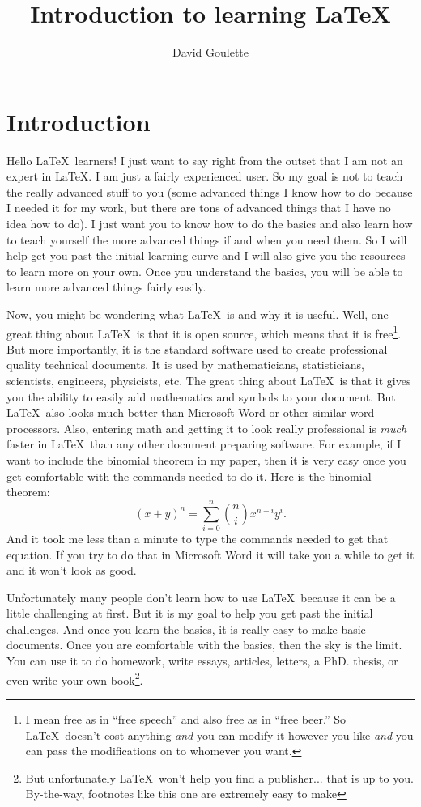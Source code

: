 \documentclass[11pt]{article}
\begin{document}
\author{David Goulette}
\title{Introduction to learning \LaTeX}
\maketitle
\section{Introduction}
Hello \LaTeX\ learners!  I just want to say right from the outset that I am not an expert in \LaTeX.  I am just a fairly experienced user.  So my goal is not to teach the really advanced stuff to you (some advanced things I know how to do because I needed it for my work, but there are tons of advanced things that I have no idea how to do).  I just want you to know how to do the basics and also learn how to teach yourself the more advanced things if and when you need them.  So I will help get you past the initial learning curve and I will also give you the resources to learn more on your own.  Once you understand the basics, you will be able to learn more advanced things fairly easily.

Now, you might be wondering what \LaTeX\ is and why it is useful. Well, one great thing about \LaTeX\ is that it is open source, which means that it is free\footnote{I mean free as in ``free speech'' and also free as in ``free beer.''  So \LaTeX\ doesn't cost anything \emph{and} you can modify it however you like \emph{and} you can pass the modifications on to whomever you want.}.  But more importantly, it is the standard software used to create professional quality technical documents.   It is used by mathematicians, statisticians, scientists, engineers, physicists, etc. The great thing about \LaTeX\ is that it gives you the ability to easily add mathematics and symbols to your document. But \LaTeX\ also looks much better than Microsoft Word or other similar word processors. Also, entering math and getting it to look really professional is \emph{much} faster in \LaTeX\ than any other document preparing software.  For example, if I want to include the binomial theorem in my paper, then it is very easy once you get comfortable with the commands needed to do it. Here is the binomial theorem:
\[
(x+y)^n=\sum_{i=0}^{n} \binom{n}{i} x^{n-i}y^i.
\]
And it took me less than a minute to type the commands needed to get that equation. If you try to do that in Microsoft Word it will take you a while to get it and it won't look as good.

Unfortunately many people don't learn how to use \LaTeX\ because it can be a little challenging at first.  But it is my goal to help you get past the initial challenges. And once you learn the basics, it is really easy to make basic documents. Once you are comfortable with the basics, then the sky is the limit.  You can use it to do homework, write essays, articles, letters, a PhD. thesis, or even write your own book\footnote{But unfortunately \LaTeX\ won't help you find a publisher... that is up to you.  By-the-way, footnotes like this one are extremely easy to make}.
\end{document}
